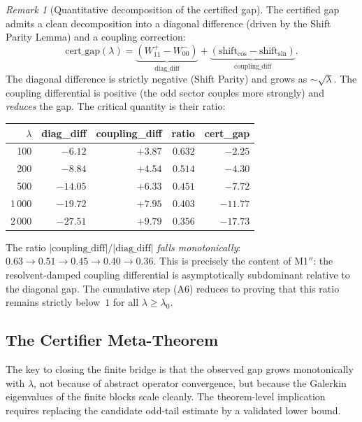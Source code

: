 \documentclass[12pt,a4paper]{article}
\theoremstyle{definition}
\theoremstyle{remark}
\newtheorem{remark}[theorem]{Remark}
\begin{document}
\begin{remark}[Quantitative decomposition of the certified gap]
\label{rem:gap-decomposition}
The certified gap admits a clean decomposition into a diagonal difference (driven by the Shift Parity Lemma) and a coupling correction:
\[
  \mathrm{cert\_gap}(\lambda) = \underbrace{(W_{11}^+ - W_{00}^-)}_{\text{diag\_diff}} + \underbrace{(\text{shift}_{\cos} - \text{shift}_{\sin})}_{\text{coupling\_diff}}.
\]
The diagonal difference is strictly negative (Shift Parity) and grows as $\sim\!\sqrt{\lambda}$. The coupling differential is positive (the odd sector couples more strongly) and \emph{reduces} the gap. The critical quantity is their ratio:

\begin{center}
\small
\begin{tabular}{r|r|r|r|r}
$\lambda$ & diag\_diff & coupling\_diff & ratio & cert\_gap \\\hline
100 & $-6.12$ & $+3.87$ & $0.632$ & $-2.25$ \\
200 & $-8.84$ & $+4.54$ & $0.514$ & $-4.30$ \\
500 & $-14.05$ & $+6.33$ & $0.451$ & $-7.72$ \\
1\,000 & $-19.72$ & $+7.95$ & $0.403$ & $-11.77$ \\
2\,000 & $-27.51$ & $+9.79$ & $0.356$ & $-17.73$
\end{tabular}
\end{center}

\noindent The ratio $|\text{coupling\_diff}|/|\text{diag\_diff}|$ \emph{falls monotonically}: $0.63 \to 0.51 \to 0.45 \to 0.40 \to 0.36$. This is precisely the content of M1$''$: the resolvent-damped coupling differential is asymptotically subdominant relative to the diagonal gap. The cumulative step (A6) reduces to proving that this ratio remains strictly below~$1$ for all $\lambda \geq \lambda_0$.
\end{remark}

\subsection{The Certifier Meta-Theorem}
\label{sec:meta-theorem}

The key to closing the finite bridge is that the observed gap grows monotonically with $\lambda$, not because of abstract operator convergence, but because the Galerkin eigenvalues of the finite blocks scale cleanly. The theorem-level implication requires replacing the candidate odd-tail estimate by a validated lower bound.
\end{document}
